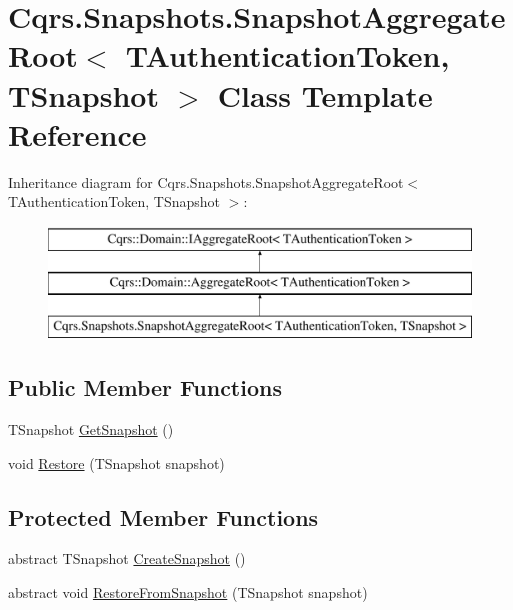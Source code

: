 \hypertarget{classCqrs_1_1Snapshots_1_1SnapshotAggregateRoot}{}\section{Cqrs.\+Snapshots.\+Snapshot\+Aggregate\+Root$<$ T\+Authentication\+Token, T\+Snapshot $>$ Class Template Reference}
\label{classCqrs_1_1Snapshots_1_1SnapshotAggregateRoot}
Inheritance diagram for Cqrs.\+Snapshots.\+Snapshot\+Aggregate\+Root$<$ T\+Authentication\+Token, T\+Snapshot $>$\+:\begin{figure}[H]
\begin{center}
\leavevmode
\includegraphics[height=3.000000cm]{classCqrs_1_1Snapshots_1_1SnapshotAggregateRoot}
\end{center}
\end{figure}
\subsection*{Public Member Functions}
\begin{DoxyCompactItemize}
\item 
T\+Snapshot \hyperlink{classCqrs_1_1Snapshots_1_1SnapshotAggregateRoot_a6116e565cb35cee459350a254bb2b893}{Get\+Snapshot} ()
\item 
void \hyperlink{classCqrs_1_1Snapshots_1_1SnapshotAggregateRoot_a58b1d2dc74a415526115f7e8240947d1}{Restore} (T\+Snapshot snapshot)
\end{DoxyCompactItemize}
\subsection*{Protected Member Functions}
\begin{DoxyCompactItemize}
\item 
abstract T\+Snapshot \hyperlink{classCqrs_1_1Snapshots_1_1SnapshotAggregateRoot_a2d8cd57c7b6c2696d286c6dc5e9f0479}{Create\+Snapshot} ()
\item 
abstract void \hyperlink{classCqrs_1_1Snapshots_1_1SnapshotAggregateRoot_aefe31de169e33147439a69017a4fd3f7}{Restore\+From\+Snapshot} (T\+Snapshot snapshot)
\end{DoxyCompactItemize}

